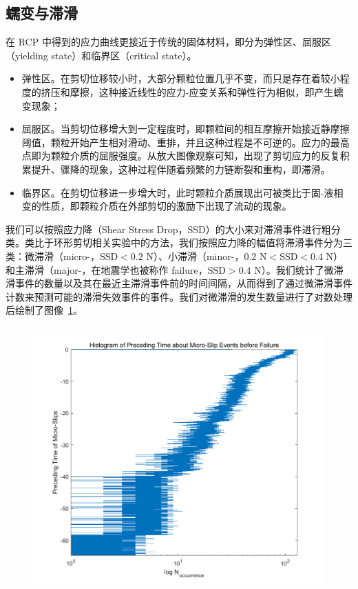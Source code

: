 \subsection{蠕变与滞滑}

在 RCP 中得到的应力曲线更接近于传统的固体材料，即分为弹性区、屈服区（yielding state）和临界区（critical state）。

\begin{itemize}
  \item 弹性区。在剪切位移较小时，大部分颗粒位置几乎不变，而只是存在着较小程度的挤压和摩擦，这种接近线性的应力-应变关系和弹性行为相似，即产生蠕变现象；
  \item 屈服区。当剪切位移增大到一定程度时，即颗粒间的相互摩擦开始接近静摩擦阈值，颗粒开始产生相对滑动、重排，并且这种过程是不可逆的。应力的最高点即为颗粒介质的屈服强度。从放大图像观察可知，出现了剪切应力的反复积累提升、骤降的现象，这种过程伴随着频繁的力链断裂和重构，即滞滑。
  \item 临界区。在剪切位移进一步增大时，此时颗粒介质展现出可被类比于固-液相变的性质，即颗粒介质在外部剪切的激励下出现了流动的现象。
\end{itemize}

我们可以按照应力降（Shear Stress Drop，SSD）的大小来对滞滑事件进行粗分类。类比于环形剪切相关实验中的方法，我们按照应力降的幅值将滞滑事件分为三类：微滞滑（micro-，$\text{SSD}<0.2$ \unit{\newton}）、小滞滑（minor-，0.2 \unit{\newton}$<\text{SSD}<0.4$ \unit{\newton}）和主滞滑（major-，在地震学也被称作 failure，$\text{SSD}>0.4$ \unit{\newton}）。我们统计了微滞滑事件的数量以及其在最近主滞滑事件前的时间间隔，从而得到了通过微滞滑事件计数来预测可能的滞滑失效事件的事件。我们对微滞滑的发生数量进行了对数处理后绘制了图像~\ref{fig:preceding_interval}。

\begin{figure}[!htp]
  \centering
  \includegraphics[height=10cm]{figures/4_preceding_interval.png}
  \label{fig:preceding_interval}
\end{figure}

